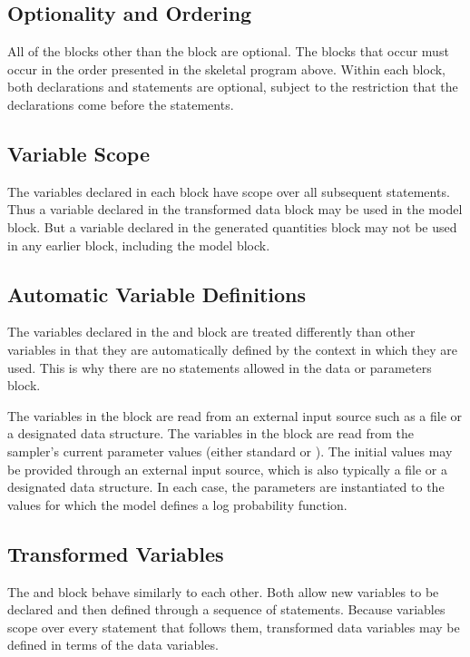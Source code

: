 \subsection{Optionality and Ordering}

All of the blocks other than the  block are optional.  The
blocks that occur must occur in the order presented in the skeletal
program above.  Within each block, both declarations and statements
are optional, subject to the restriction that the declarations come
before the statements.

\subsection{Variable Scope}

The variables declared in each block have scope over all subsequent
statements.  Thus a variable declared in the transformed data block
may be used in the model block.  But a variable declared in the
generated quantities block may not be used in any earlier block,
including the model block.

\subsection{Automatic Variable Definitions}

The variables declared in the  and  block
are treated differently than other variables in that they are
automatically defined by the context in which they are used.  This is
why there are no statements allowed in the data or parameters block.

The variables in the  block are read from an external input
source such as a file or a designated \R data structure.  The
variables in the  block are read from the sampler's
current parameter values (either standard \HMC or \NUTS).  The initial
values may be provided through an external input source, which is also
typically a file or a designated \R data structure.  In each case, the
parameters are instantiated to the values for which the model defines
a log probability function.

\subsection{Transformed Variables}

The  and  block
behave similarly to each other.  Both allow new variables to be
declared and then defined through a sequence of statements.  Because
variables scope over every statement that follows them, transformed
data variables may be defined in terms of the data variables.

